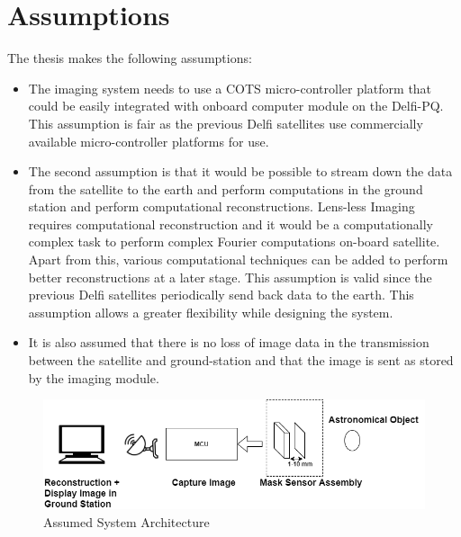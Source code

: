 \section{Assumptions}
The thesis makes the following assumptions:
\begin{itemize}
\item The imaging system needs to use a COTS micro-controller platform that could be easily integrated with onboard computer module on the Delfi-PQ. This assumption is fair as the previous Delfi satellites use commercially available micro-controller platforms for use.
\item The second assumption is that it would be possible to stream down the data from the satellite to the earth and perform computations in the ground station and perform computational reconstructions. Lens-less Imaging requires computational reconstruction and it would be a computationally complex task to perform complex Fourier computations on-board satellite. Apart from this, various computational techniques can be added to perform better reconstructions at a later stage. This assumption is valid since the previous Delfi satellites periodically send back data to the earth. This assumption allows a greater flexibility while designing the system.
\item It is also assumed that there is no loss of image data in the transmission between the satellite and ground-station and that the image is sent as stored by the imaging module.
\end{itemize}
\begin{figure}[htb]
\includegraphics[width=\textwidth]{pics/Sys-Arch-1}
\caption{Assumed System Architecture}
\label{fig:System Architecture}
\end{figure}

\vspace{1\baselineskip}

\noindent



